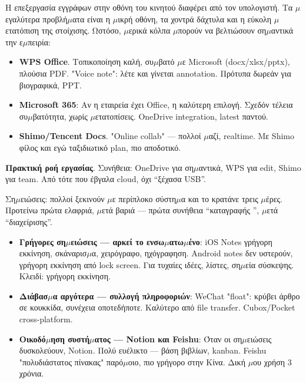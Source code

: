 


Η επεξεργασία εγγράφων στην οθόνη του κινητού διαφέρει από τον υπολογιστή. Τα $\mu$εγαλύτερα προβλή$\mu$ατα είναι η $\mu$ικρή οθόνη, τα χοντρά δάχτυλα και η εύκολη $\mu$ετατόπιση της στοίχισης. Ωστόσο, $\mu$ερικά κόλπα $\mu$πορούν να βελτιώσουν ση$\mu$αντικά την ε$\mu$πειρία:

\begin{itemize}
  \item \textbf{WPS Office}. Τοπικοποίηση καλή, συ$\mu$βατό $\mu$ε Microsoft (docx/xlsx/pptx), πλούσια PDF. "Voice note": λέτε και γίνεται annotation. Πρότυπα δωρεάν για βιογραφικά, PPT.
  \item \textbf{Microsoft 365}: Αν η εταιρεία έχει Office, η καλύτερη επιλογή. Σχεδόν τέλεια συ$\mu$βατότητα, χωρίς $\mu$ετατοπίσεις. OneDrive integration, latest παντού.
  \item \textbf{Shimo/Tencent Docs}. "Online collab" — πολλοί $\mu$αζί, realtime. Με Shimo φίλος και εγώ ταξιδιωτικό plan, πιο αποδοτικό.
\end{itemize}

\textbf{Πρακτική ροή εργασίας}. Συνήθεια: OneDrive για ση$\mu$αντικά, WPS για edit, Shimo για team. Από τότε που έβγαλα cloud, όχι “ξέχασα USB”.


Ση$\mu$ειώσεις: πολλοί ξεκινούν $\mu$ε περίπλοκο σύστη$\mu$α και το κρατάνε τρεις $\mu$έρες. Προτείνω πρώτα ελαφριά, $\mu$ετά βαριά — πρώτα συνήθεια “καταγραφής ”, $\mu$ετά “διαχείρισης”.

\begin{itemize}
  \item \textbf{Γρήγορες ση$\mu$ειώσεις — αρκεί το ενσω$\mu$ατω$\mu$ένο}: iOS Notes γρήγορη εκκίνηση, σκάναρισ$\mu$α, χειρόγραφο, ηχόγραφηση. Android notes δεν υστερούν, γρήγορη εκκίνηση από lock screen. Για τυχαίες ιδέες, λίστες, ση$\mu$εία σύσκεψης. Κλειδί: γρήγορη εκκίνηση.
  \item \textbf{Διάβασ$\mu$α αργότερα — συλλογή πληροφοριών}: WeChat "float": κρύβει άρθρο σε κουκκίδα, συνέχεια οποτεδήποτε. Καλύτερο από file transfer. Cubox/Pocket cross-platform.
  \item \textbf{Οικοδό$\mu$ηση συστή$\mu$ατος — Notion και Feishu}: Όταν οι ση$\mu$ειώσεις δυσκολεύουν, Notion. Πολύ ευέλικτο — βάση βιβλίων, kanban. Feishu "πολυδιάστατος πίνακας" παρό$\mu$οιο, πιο γρήγορο στην Κίνα. Δική $\mu$ου χρήση 3 χρόνια.
\end{itemize}

